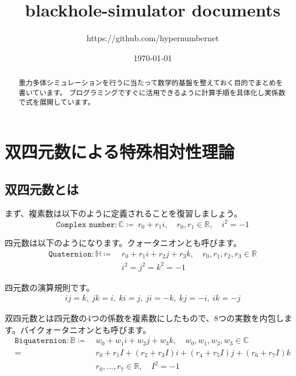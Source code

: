 \documentclass[a4paper,12pt,notitlepage]{jsreport}
\title{blackhole-simulator documents}
\author{https://github.com/hypernumbernet}
\date{\today}
\begin{document}
\maketitle

\begin{abstract}
  重力多体シミュレーションを行うに当たって数学的基盤を整えておく目的でまとめを書いています。
  プログラミングですぐに活用できるように計算手順を具体化し実係数で式を展開しています。
\end{abstract}

\chapter{双四元数による特殊相対性理論}

\section{双四元数とは}

まず、複素数は以下のように定義されることを復習しましょう。
\begin{equation}
  \texttt{Complex number}:\mathbb{C}\coloneq ~r_0+r_1i,\quad r_0,r_1\in\mathbb{R},\quad i^2=-1
\end{equation}

四元数は以下のようになります。クォータニオンとも呼びます。
\begin{equation}
  \begin{split}
    \texttt{Quaternion}:\mathbb{H}\coloneq ~&r_0+r_1i+r_2j+r_3k,\quad r_0,r_1,r_2,r_3\in\mathbb{R}\\
    &i^2=j^2=k^2=-1
  \end{split}
\end{equation}

四元数の演算規則です。
\begin{gather}
  ij=k,~jk=i,~ki=j,~ji=-k,~kj=-i,~ik=-j
\end{gather}

双四元数とは四元数の4つの係数を複素数にしたもので、8つの実数を内包します。バイクォータニオンとも呼びます。
\begin{equation}
  \begin{split}
    \texttt{Biquaternion}:\mathbb{B}\coloneq ~&w_0+w_1i+w_2j+w_3k,\quad w_0,w_1,w_2,w_3\in\mathbb{C}\\
    =~&r_0+r_1I+(r_2+r_3I)i+(r_4+r_5I)j+(r_6+r_7I)k\\
    &r_0,...,r_7\in\mathbb{R},\quad I^2=-1
  \end{split}
\end{equation}
\end{document}
